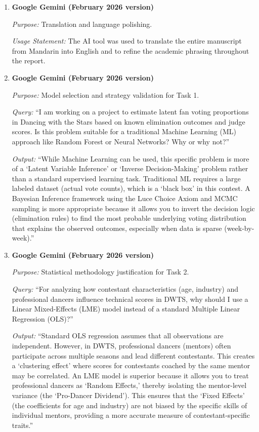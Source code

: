 \documentclass[12pt]{article}
\begin{document}
	\begin{enumerate}[leftmargin=*,itemsep=1em]
		\item \textbf{Google Gemini (February 2026 version)}
		
		\textit{Purpose:} Translation and language polishing.
		
		\textit{Usage Statement:} The AI tool was used to translate the entire manuscript from Mandarin into English and to refine the academic phrasing throughout the report.
		
		\item \textbf{Google Gemini (February 2026 version)}
		
		\textit{Purpose:} Model selection and strategy validation for Task 1.
		
		\textit{Query:} ``I am working on a project to estimate latent fan voting proportions in Dancing with the Stars based on known elimination outcomes and judge scores. Is this problem suitable for a traditional Machine Learning (ML) approach like Random Forest or Neural Networks? Why or why not?''
		
		\textit{Output:} ``While Machine Learning can be used, this specific problem is more of a `Latent Variable Inference' or `Inverse Decision-Making' problem rather than a standard supervised learning task. Traditional ML requires a large labeled dataset (actual vote counts), which is a `black box' in this contest. A Bayesian Inference framework using the Luce Choice Axiom and MCMC sampling is more appropriate because it allows you to invert the decision logic (elimination rules) to find the most probable underlying voting distribution that explains the observed outcomes, especially when data is sparse (week-by-week).''
		
		\item \textbf{Google Gemini (February 2026 version)}
		
		\textit{Purpose:} Statistical methodology justification for Task 2.
		
		\textit{Query:} ``For analyzing how contestant characteristics (age, industry) and professional dancers influence technical scores in DWTS, why should I use a Linear Mixed-Effects (LME) model instead of a standard Multiple Linear Regression (OLS)?''
		
		\textit{Output:} ``Standard OLS regression assumes that all observations are independent. However, in DWTS, professional dancers (mentors) often participate across multiple seasons and lead different contestants. This creates a `clustering effect' where scores for contestants coached by the same mentor may be correlated. An LME model is superior because it allows you to treat professional dancers as `Random Effects,' thereby isolating the mentor-level variance (the `Pro-Dancer Dividend'). This ensures that the `Fixed Effects' (the coefficients for age and industry) are not biased by the specific skills of individual mentors, providing a more accurate measure of contestant-specific traits.''
	\end{enumerate}
	
\end{document}
